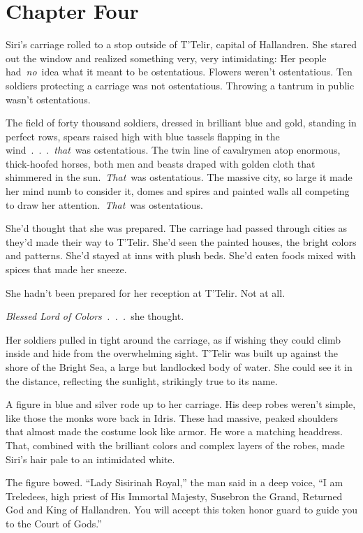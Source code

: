 \section{Chapter Four}

Siri’s carriage rolled to a stop outside of T’Telir, capital of Hallandren. She stared out the window and realized something very, very intimidating: Her people had~\textit{no}~idea what it meant to be ostentatious. Flowers weren’t ostentatious. Ten soldiers protecting a carriage was not ostentatious. Throwing a tantrum in public wasn’t ostentatious.

The field of forty thousand soldiers, dressed in brilliant blue and gold, standing in perfect rows, spears raised high with blue tassels flapping in the wind~.~.~.~\textit{that}~was ostentatious. The twin line of cavalrymen atop enormous, thick-hoofed horses, both men and beasts draped with golden cloth that shimmered in the sun.~\textit{That}~was ostentatious. The massive city, so large it made her mind numb to consider it, domes and spires and painted walls all competing to draw her attention.~\textit{That}~was ostentatious.

She’d thought that she was prepared. The carriage had passed through cities as they’d made their way to T’Telir. She’d seen the painted houses, the bright colors and patterns. She’d stayed at inns with plush beds. She’d eaten foods mixed with spices that made her sneeze.

She hadn’t been prepared for her reception at T’Telir. Not at all.

\textit{Blessed Lord of Colors~.~.~.}~she thought.

Her soldiers pulled in tight around the carriage, as if wishing they could climb inside and hide from the overwhelming sight. T’Telir was built up against the shore of the Bright Sea, a large but landlocked body of water. She could see it in the distance, reflecting the sunlight, strikingly true to its name.

A figure in blue and silver rode up to her carriage. His deep robes weren’t simple, like those the monks wore back in Idris. These had massive, peaked shoulders that almost made the costume look like armor. He wore a matching headdress. That, combined with the brilliant colors and complex layers of the robes, made Siri’s hair pale to an intimidated white.

The figure bowed. “Lady Sisirinah Royal,” the man said in a deep voice, “I am Treledees, high priest of His Immortal Majesty, Susebron the Grand, Returned God and King of Hallandren. You will accept this token honor guard to guide you to the Court of Gods.”

